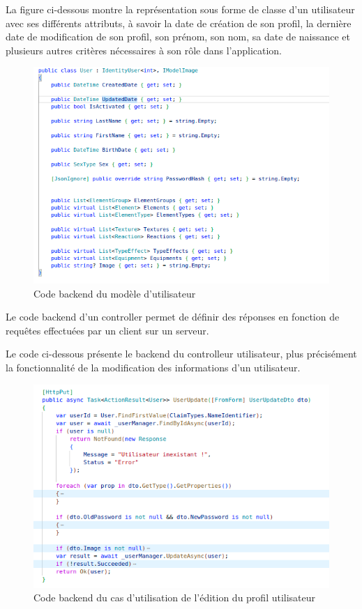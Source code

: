 La figure ci-dessous montre la représentation sous forme de classe d'un utilisateur avec ses différents attributs, à savoir la date de création de son profil, la dernière date de modification de son profil, son prénom, son nom, sa date de naissance et plusieurs autres critères nécessaires à son rôle dans l'application.

\begin{figure}[H]
	\centering
	\includegraphics[width=1\textwidth]{img/codeuu}
	\caption{Code backend du modèle d'utilisateur}
	\label{fig:mesh1}
\end{figure}

Le code backend d'un controller permet de définir des réponses en fonction de requêtes effectuées par un client sur un serveur.

Le code ci-dessous présente le backend du controlleur utilisateur, plus précisément la fonctionnalité de la modification des informations d'un utilisateur.

\begin{figure}[H]
	\centering
	\includegraphics[width=1\textwidth]{img/codeuup}
	\caption{Code backend du cas d'utilisation de l'édition du profil utilisateur}
	\label{fig:mesh1}
\end{figure}


